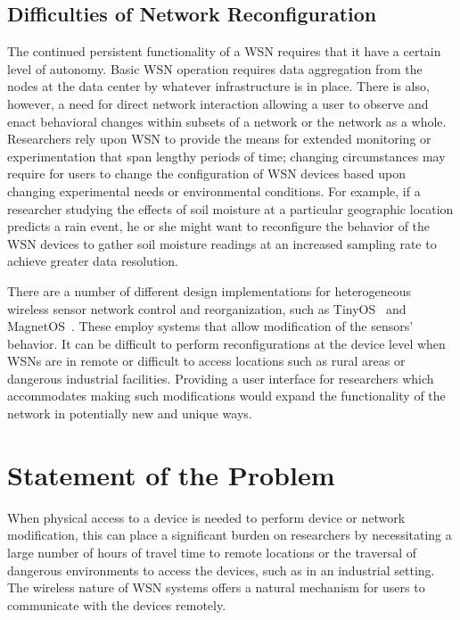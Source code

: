 \subsection{Difficulties of Network Reconfiguration}

The continued persistent functionality of a WSN requires that it have a certain level of autonomy. Basic WSN operation requires data aggregation from the nodes at the data center by whatever infrastructure is in place. There is also, however, a need for direct network interaction allowing a user to observe and enact behavioral changes within subsets of a network or the network as a whole. Researchers rely upon WSN to provide the means for extended monitoring or experimentation that span lengthy periods of time; changing circumstances may require for users to change the configuration of WSN devices based upon changing experimental needs or environmental conditions. For example, if a researcher studying the effects of soil moisture at a particular geographic location predicts a rain event, he or she might want to reconfigure the behavior of the WSN devices to gather soil moisture readings at an increased sampling rate to achieve greater data resolution.

There are a number of different design implementations for heterogeneous wireless sensor network control and reorganization, such as TinyOS~\cite{levis2005tinyos} and MagnetOS~\cite{Barr}. These employ systems that allow modification of the sensors' behavior. It can be difficult to perform reconfigurations at the device level when WSNs are in remote or difficult to access locations such as rural areas or dangerous industrial facilities. Providing a user interface for researchers which accommodates making such modifications would expand the functionality of the network in potentially new and unique ways.

\section{Statement of the Problem}

When physical access to a device is needed to perform device or network modification, this can place a significant burden on researchers by necessitating a large number of hours of travel time to remote locations or the traversal of dangerous environments to access the devices, such as in an industrial setting. The wireless nature of WSN systems offers a natural mechanism for users to communicate with the devices remotely.

